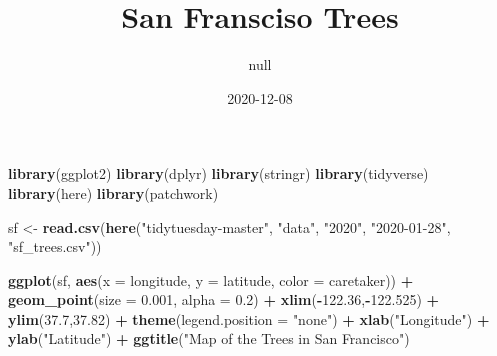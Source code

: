 \documentclass[
]{article}
\title{San Fransciso Trees}
\author{null}
\date{2020-12-08}
\newenvironment{Shaded}{\begin{snugshade}}{\end{snugshade}}
\newcommand{\DataTypeTok}[1]{\textcolor[rgb]{0.13,0.29,0.53}{#1}}
\newcommand{\FloatTok}[1]{\textcolor[rgb]{0.00,0.00,0.81}{#1}}
\newcommand{\KeywordTok}[1]{\textcolor[rgb]{0.13,0.29,0.53}{\textbf{#1}}}
\newcommand{\NormalTok}[1]{#1}
\newcommand{\OperatorTok}[1]{\textcolor[rgb]{0.81,0.36,0.00}{\textbf{#1}}}
\newcommand{\StringTok}[1]{\textcolor[rgb]{0.31,0.60,0.02}{#1}}
\begin{document}
\maketitle

\begin{Shaded}
\begin{Highlighting}[]
\KeywordTok{library}\NormalTok{(ggplot2)}
\KeywordTok{library}\NormalTok{(dplyr)}
\KeywordTok{library}\NormalTok{(stringr)}
\KeywordTok{library}\NormalTok{(tidyverse)}
\KeywordTok{library}\NormalTok{(here)}
\KeywordTok{library}\NormalTok{(patchwork)}
\end{Highlighting}
\end{Shaded}

\begin{Shaded}
\begin{Highlighting}[]
\NormalTok{sf <-}\StringTok{ }\KeywordTok{read.csv}\NormalTok{(}\KeywordTok{here}\NormalTok{(}\StringTok{"tidytuesday-master"}\NormalTok{, }\StringTok{"data"}\NormalTok{, }\StringTok{"2020"}\NormalTok{, }\StringTok{"2020-01-28"}\NormalTok{, }\StringTok{"sf_trees.csv"}\NormalTok{))}
\end{Highlighting}
\end{Shaded}

\begin{Shaded}
\begin{Highlighting}[]
\KeywordTok{ggplot}\NormalTok{(sf, }\KeywordTok{aes}\NormalTok{(}\DataTypeTok{x =}\NormalTok{ longitude, }\DataTypeTok{y =}\NormalTok{ latitude, }\DataTypeTok{color =}\NormalTok{ caretaker)) }\OperatorTok{+}
\StringTok{  }\KeywordTok{geom_point}\NormalTok{(}\DataTypeTok{size =} \FloatTok{0.001}\NormalTok{, }\DataTypeTok{alpha =} \FloatTok{0.2}\NormalTok{) }\OperatorTok{+}
\StringTok{  }\KeywordTok{xlim}\NormalTok{(}\OperatorTok{-}\FloatTok{122.36}\NormalTok{,}\OperatorTok{-}\FloatTok{122.525}\NormalTok{) }\OperatorTok{+}\StringTok{ }
\StringTok{  }\KeywordTok{ylim}\NormalTok{(}\FloatTok{37.7}\NormalTok{,}\FloatTok{37.82}\NormalTok{) }\OperatorTok{+}
\StringTok{  }\KeywordTok{theme}\NormalTok{(}\DataTypeTok{legend.position =} \StringTok{"none"}\NormalTok{) }\OperatorTok{+}
\StringTok{  }\KeywordTok{xlab}\NormalTok{(}\StringTok{"Longitude"}\NormalTok{) }\OperatorTok{+}
\StringTok{  }\KeywordTok{ylab}\NormalTok{(}\StringTok{"Latitude"}\NormalTok{) }\OperatorTok{+}
\StringTok{  }\KeywordTok{ggtitle}\NormalTok{(}\StringTok{"Map of the Trees in San Francisco"}\NormalTok{)}
\end{Highlighting}
\end{Shaded}
\end{document}
